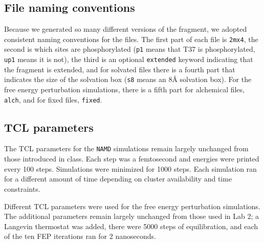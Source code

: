 \subsection{File naming conventions}
Because we generated so many different versions of the fragment, we adopted consistent naming conventions for the files.
The first part of each file is \texttt{2mx4},
the second is which sites are phosphorylated (\texttt{p1} means that T37 is phosphorylated, \texttt{up1} means it is not),
the third is an optional \texttt{extended} keyword indicating that the fragment is extended,
and for solvated files there is a fourth part that indicates the size of the solvation box (\texttt{s8} means an 8{\AA} solvation box).
For the free energy perturbation simulations, there is a fifth part for alchemical files, \texttt{alch}, and for fixed files, \texttt{fixed}.

\subsection{TCL parameters}
The TCL parameters for the \texttt{NAMD} simulations remain largely unchanged from those introduced in class.
Each step was a femtosecond and energies were printed every 100 steps.
Simulations were minimized for 1000 steps.
Each simulation ran for a different amount of time depending on cluster availability and time constraints.

Different TCL parameters were used for the free energy perturbation simulations.
The additional parameters remain largely unchanged from those used in Lab 2;
a Langevin thermostat was added, there were 5000 steps of equilibration, and each of the ten FEP iterations ran for 2 nanoseconds.

